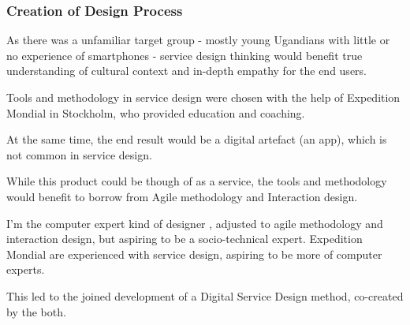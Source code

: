 


\subsubsection{Creation of Design Process}
As there was a unfamiliar target group - mostly young Ugandians with little or no experience of smartphones - service design thinking would benefit true understanding of cultural context and in-depth empathy for the end users.

Tools and methodology in service design were chosen with the help of Expedition Mondial in Stockholm, who provided education and coaching.

At the same time, the end result would be a digital artefact (an app), which is not common in service design.

While this product could be though of as a service, the tools and methodology would benefit to borrow from Agile methodology and Interaction design.

I'm the computer expert kind of designer \citep{lowgren}, adjusted to agile methodology and interaction design, but aspiring to be a socio-technical expert. Expedition Mondial are experienced with service design, aspiring to be more of computer experts.

This led to the joined development of a Digital Service Design method, co-created by the both.




